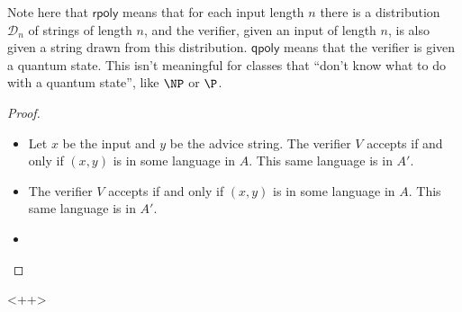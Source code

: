 Note here that $\mathsf{rpoly}$ means that for each input length $n$ there is a distribution $\mathcal{D}_n$ of strings of length $n$, and the verifier, given an input of length $n$, is also given a string drawn from this distribution. $\mathsf{qpoly}$ means that the verifier is given a quantum state. This isn't meaningful for classes that ``don't know what to do with a quantum state'', like $\NP$ or $\P$.

\begin{proof}
    \begin{itemize} 
        \item Let $x$ be the input and $y$ be the advice string. The verifier $V$ accepts if and only if $(x,y)$ is in some language in $A$. This same language is in $A'$. 
        \item The verifier $V$ accepts if and only if $(x,y)$ is in some language in $A$. This same language is in $A'$. 
        \item 
    \end{itemize}
\end{proof}<++>







